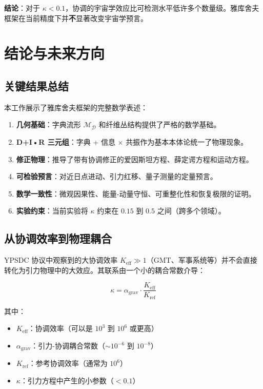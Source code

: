 \documentclass[11pt,a4paper]{article}
\begin{document}
	\textbf{结论}：对于 $\kappa < 0.1$，协调的宇宙学效应比可检测水平低许多个数量级。雅库舍夫框架在当前精度下并\textbf{不}显著改变宇宙学预言。
	
	\section{结论与未来方向}
	\subsection{关键结果总结}
	
	本工作展示了雅库舍夫框架的完整数学表述：
	
	\begin{enumerate}
		\item \textbf{几何基础}：字典流形 $\mathcal{M}_{\mathcal{D}}$ 和纤维丛结构提供了严格的数学基础。
		
		\item \textbf{D+I•R 三元组}：字典 + 信息 × 共振作为基本本体论统一了物理现象。
		
		\item \textbf{修正物理}：推导了带有协调修正的爱因斯坦方程、薛定谔方程和运动方程。
		
		\item \textbf{可检验预言}：对近日点进动、引力红移、量子测量的定量预言。
		
		\item \textbf{数学一致性}：微观因果性、能量-动量守恒、可重整化性和恢复极限的证明。
		
		\item \textbf{实验约束}：当前实验将 $\kappa$ 约束在 $0.15$ 到 $0.5$ 之间（跨多个领域）。
	\end{enumerate}
	
	\subsection{从协调效率到物理耦合}
	\label{subsec:keff-to-coupling}
	
	YPSDC 协议中观察到的大协调效率 $K_{\mathrm{eff}} \gg 1$（GMT、军事系统等）并不会直接转化为引力物理中的大效应。其联系由一个小的耦合常数介导：
	
	\begin{equation}
		\kappa = \alpha_{\text{grav}} \cdot \frac{K_{\mathrm{eff}}}{K_{\text{ref}}}
	\end{equation}
	
	其中：
	\begin{itemize}
		\item $K_{\mathrm{eff}}$：协调效率（可以是 $10^3$ 到 $10^6$ 或更高）
		\item $\alpha_{\text{grav}}$：引力-协调耦合常数（$\sim 10^{-6}$ 到 $10^{-8}$）
		\item $K_{\text{ref}}$：参考协调效率（通常为 $10^6$）
		\item $\kappa$：引力方程中产生的小参数（$< 0.1$）
	\end{itemize}
	
\end{document}
